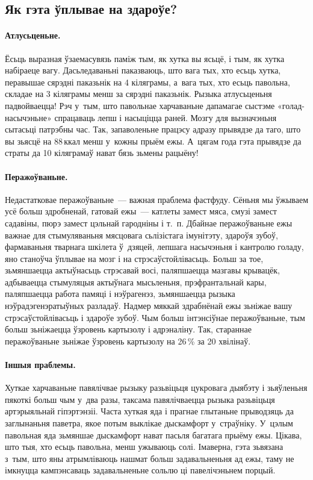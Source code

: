 \subsection{Як гэта ўплывае на здароўе?}

\paragraph{Атлусьценьне.}
Ёсьць выразная ўзаемасувязь паміж тым, як хутка вы ясьцё, і тым, як хутка набіраеце вагу. Дасьледаваньні паказваюць, што вага тых, хто есьць хутка, перавышае сярэдні паказьнік на 4 кіляграмы, а~вага тых, хто есьць павольна, складае на 3 кіляграмы менш за сярэдні паказьнік. Рызыка атлусьценьня падвойваецца! Рэч у~тым, што павольнае харчаваньне дапамагае сыстэме «голад-насычэньне» спрацаваць лепш і насыціцца раней. Мозгу для вызначэньня сытасьці патрэбны час. Так, запаволеньне працэсу адразу прывядзе да таго, што вы зьясцё на 88\,ккал менш у~кожны прыём ежы. А~цягам года гэта прывядзе да страты да 10 кіляграмаў нават бязь зьмены рацыёну!

\paragraph{Перажоўваньне.}
Недастатковае перажоўваньне~--- важная праблема фастфуду. Сёньня мы ўжываем усё больш здробненай, гатовай ежы~--- катлеты замест мяса, смузі замест садавіны, пюрэ замест цэльнай гародніны і т.~п. Дбайнае перажоўваньне ежы важнае для стымуляваньня мясцовага сьлізістага імунітэту, здароўя зубоў, фармаваньня тварнага шкілета ў~дзяцей, лепшага насычэньня і кантролю голаду, яно станоўча ўплывае на мозг і на стрэсаўстойлівасьць. Больш за тое, зьмяншаецца актыўнасьць стрэсавай восі, паляпшаецца мазгавы крывацёк, адбываецца стымуляцыя актыўнага мысьленьня, прэфрантальнай кары, паляпшаецца работа памяці і нэўрагенэз, зьмяншаецца рызыка нэўрадэгенэратыўных разладаў. Надмер мяккай здрабнёнай ежы зьніжае вашу стрэсаўстойлівасьць і здароўе зубоў. Чым больш інтэнсіўнае перажоўваньне, тым больш зьніжаецца ўзровень картызолу і адрэналіну. Так, стараннае перажоўваньне зьніжае ўзровень картызолу на 26\,\% за 20 хвілінаў.

\paragraph{Іншыя праблемы.}
Хуткае харчаваньне павялічвае рызыку разьвіцьця цукровага дыябэту і зьяўленьня пякоткі больш чым у~два разы, таксама павялічваецца рызыка разьвіцьця артэрыяльнай гіпэртэнзіі. Часта хуткая яда і прагнае глытаньне прыводзяць да заглынаньня паветра, якое потым выклікае дыскамфорт у~страўніку. У~цэлым павольная яда зьмяншае дыскамфорт нават пасьля багатага прыёму ежы. Цікава, што тыя, хто есьць павольна, менш ужываюць солі. Імаверна, гэта зьвязана з~тым, што яны атрымліваюць нашмат больш задавальненьня ад ежы, таму не імкнуцца кампэнсаваць задавальненьне сольлю ці павелічэньнем порцый.

